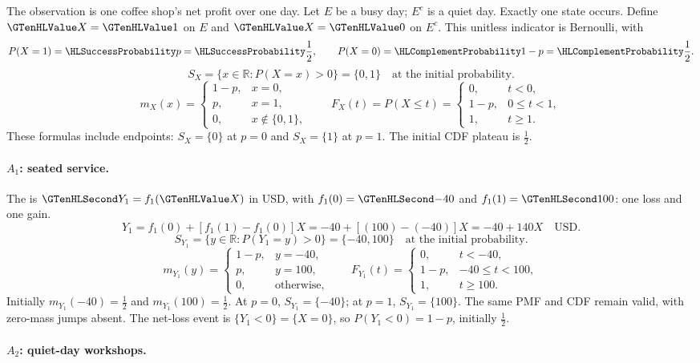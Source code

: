The observation is one coffee shop's net profit over one day. Let $E$ be a busy day; $E^c$ is a quiet day. Exactly one state occurs. Define $\Indicator{X}=\Indicator{1}$ on $E$ and $\Indicator{X}=\Indicator{0}$ on $E^c$. This unitless indicator is Bernoulli, with
\[P(X=1)=\SuccessProb{p}=\SuccessProb{\frac{1}{2}},\qquad P(X=0)=\FailureProb{1-p}=\FailureProb{\frac{1}{2}}.\]
\[S_X=\{x\in\mathbb R:P(X=x)>0\}=\{0,1\}\quad\text{at the initial probability}.\]
\[m_X(x)=\begin{cases}1-p,&x=0,\\p,&x=1,\\0,&x\notin\{0,1\},\end{cases}\qquad F_X(t)=P(X\leq t)=\begin{cases}0,&t<0,\\1-p,&0\leq t<1,\\1,&t\geq1.\end{cases}\]
These formulas include endpoints: $S_X=\{0\}$ at $p=0$ and $S_X=\{1\}$ at $p=1$. The initial CDF plateau is $\frac{1}{2}$.
\paragraph{$A_1$: seated service.}
The  is $\Money{Y_1}=f_1(\Indicator{X})$ in USD,
with $f_1(0)=\Money{-40}$ and $f_1(1)=\Money{100}$: one loss and one gain.
\[
Y_1=f_1(0)+[f_1(1)-f_1(0)]X=-40+[(100)-(-40)]X=-40+140X\quad\text{USD}.
\]
\[S_{Y_1}=\{y\in\mathbb R:P(Y_1=y)>0\}=\{-40,100\}\quad\text{at the initial probability}.\]
\[
m_{Y_1}(y)=\begin{cases}1-p,&y=-40,\\p,&y=100,\\0,&\text{otherwise},\end{cases}
\qquad F_{Y_1}(t)=\begin{cases}0,&t<-40,\\1-p,&-40\leq t<100,\\1,&t\geq 100.\end{cases}
\]
Initially $m_{Y_1}(-40)=\frac{1}{2}$ and $m_{Y_1}(100)=\frac{1}{2}$.
At $p=0$, $S_{Y_1}=\{-40\}$; at $p=1$, $S_{Y_1}=\{100\}$.
The same PMF and CDF remain valid, with zero-mass jumps absent.
The net-loss event is $\{Y_1<0\}=\{X=0\}$, so $P(Y_1<0)=1-p$,
initially $\frac{1}{2}$.
\paragraph{$A_2$: quiet-day workshops.}
